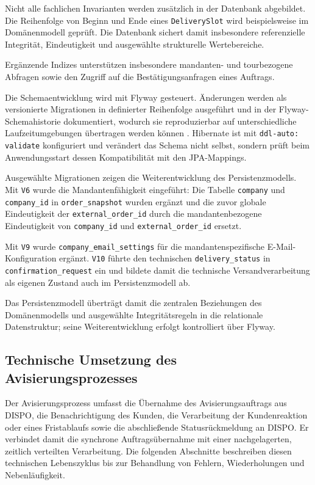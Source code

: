 \documentclass[
  12pt,
  a4paper,
  oneside
]{article}
\begin{document}
Nicht alle fachlichen Invarianten werden zusätzlich in der Datenbank
abgebildet. Die Reihenfolge von Beginn und Ende eines \texttt{DeliverySlot}
wird beispielsweise im Domänenmodell geprüft. Die Datenbank sichert damit
insbesondere referenzielle Integrität, Eindeutigkeit und ausgewählte
strukturelle Wertebereiche.

Ergänzende Indizes unterstützen insbesondere mandanten- und tourbezogene
Abfragen sowie den Zugriff auf die Bestätigungsanfragen eines Auftrags.

Die Schemaentwicklung wird mit Flyway gesteuert. Änderungen werden als
versionierte Migrationen in definierter Reihenfolge ausgeführt und in der
Flyway-Schemahistorie dokumentiert, wodurch sie reproduzierbar auf
unterschiedliche Laufzeitumgebungen übertragen werden können
\parencite{redgate2024versionedMigrations}. Hibernate ist mit
\texttt{ddl-auto: validate} konfiguriert und verändert das Schema nicht selbst,
sondern prüft beim Anwendungsstart dessen Kompatibilität mit den JPA-Mappings.

Ausgewählte Migrationen zeigen die Weiterentwicklung des Persistenzmodells.
Mit \texttt{V6} wurde die Mandantenfähigkeit eingeführt: Die Tabelle
\texttt{company} und \texttt{company\_id} in \texttt{order\_snapshot} wurden
ergänzt und die zuvor globale Eindeutigkeit der
\texttt{external\_order\_id} durch die mandantenbezogene Eindeutigkeit von
\texttt{company\_id} und \texttt{external\_order\_id} ersetzt.

Mit \texttt{V9} wurde \texttt{company\_email\_settings} für die
mandantenspezifische E-Mail-Konfiguration ergänzt. \texttt{V10} führte den
technischen \texttt{delivery\_status} in
\texttt{confirmation\_request} ein und bildete damit die technische
Versandverarbeitung als eigenen Zustand auch im Persistenzmodell ab.

Das Persistenzmodell überträgt damit die zentralen Beziehungen des
Domänenmodells und ausgewählte Integritätsregeln in die relationale
Datenstruktur; seine Weiterentwicklung erfolgt kontrolliert über Flyway.

\subsection{Technische Umsetzung des Avisierungsprozesses}
\label{sec:prozessumsetzung}

Der Avisierungsprozess umfasst die Übernahme des Avisierungsauftrags aus DISPO,
die Benachrichtigung des Kunden, die Verarbeitung der Kundenreaktion oder eines
Fristablaufs sowie die abschließende Statusrückmeldung an DISPO. Er verbindet
damit die synchrone Auftragsübernahme mit einer nachgelagerten, zeitlich
verteilten Verarbeitung. Die folgenden Abschnitte beschreiben diesen
technischen Lebenszyklus bis zur Behandlung von Fehlern, Wiederholungen und
Nebenläufigkeit.
\end{document}
